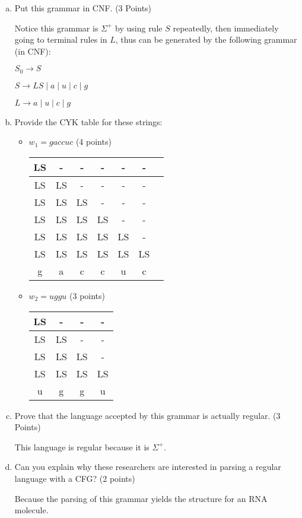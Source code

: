 \documentclass{article}
\begin{document}
    \begin{enumerate}[(a)]
\item Put this grammar in CNF. (3 Points)

    Notice this grammar is $\Sigma^+$ by using rule $S$ repeatedly, then immediately
    going to terminal rules in $L$, thus can be generated by the following grammar (in CNF):

    $S_0 \rightarrow S$

    $S \rightarrow LS \;|\; a \;|\; u \;|\; c \;|\; g$

    $L \rightarrow  a \;|\; u \;|\; c \;|\; g$

    \item Provide the CYK table for these strings:

    \begin{itemize}
\item $w_1=gaccuc$ (4 points)

    \begin{tabular}{|c|c|c|c|c|c|c|}
    \hline
    LS&-&-&-&-&-\\
    \hline
    LS&LS&-&-&-&-\\
    \hline
    LS&LS&LS&-&-&-\\
    \hline
    LS&LS&LS&LS&-&-\\
    \hline
    LS&LS&LS&LS&LS&-\\
    \hline
    LS&LS&LS&LS&LS&LS\\
    \hline
    g&a&c&c&u&c\\
    \hline
    \end{tabular}
\item $w_2=uggu$ (3 points)

    \begin{tabular}{|c|c|c|c|}
    \hline
    LS&-&-&-\\
    \hline
    LS&LS&-&-\\
    \hline
    LS&LS&LS&-\\
    \hline
    LS&LS&LS&LS\\
    \hline
    u&g&g&u\\
    \hline
    \end{tabular}
    \end{itemize}

\item Prove that the language accepted by this grammar is actually regular. (3 Points)

    This language is regular because it is $\Sigma^+$.

    \item Can you explain why these researchers are interested in parsing a regular language with
a CFG? (2 points)

    Because the parsing of this grammar yields the structure for an RNA molecule.
    \end{enumerate}
\end{document}
